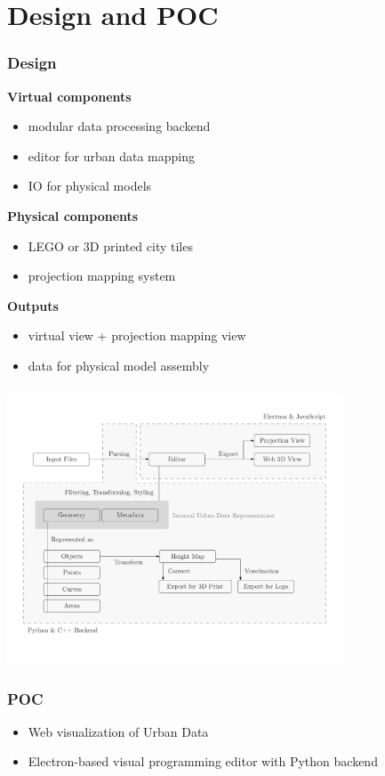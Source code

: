 \documentclass[czech,xcolor={table}]{beamer}
\begin{document}

	\section{Design and POC}

	\begin{frame}
		\frametitle{Design}
		\textbf{Virtual components}
		\begin{itemize}
			\item modular data processing backend 
			\item editor for urban data mapping
			\item IO for physical models
		\end{itemize}
		\textbf{Physical components}
		\begin{itemize}
			\item LEGO or 3D printed city tiles
			\item projection mapping system
		\end{itemize}
		\textbf{Outputs}
		\begin{itemize}
			\item virtual view + projection mapping view
			\item data for physical model assembly
		\end{itemize}
	\end{frame}

	\begin{frame}
		\frametitle{}
		\begin{center}
			\includegraphics[width=0.75\textwidth]{imgs/app.pdf}
		\end{center}
	\end{frame}

	\begin{frame}
		\frametitle{POC}

		\begin{itemize}
			\item Web visualization of Urban Data
			\item Electron-based visual programming editor with Python backend
		\end{itemize}
	\end{frame}
\end{document}
